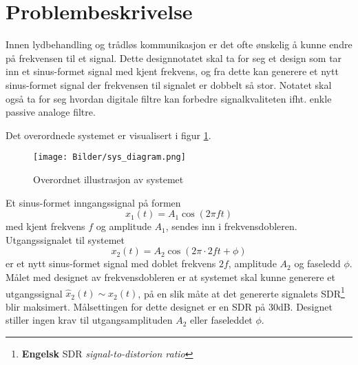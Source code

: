 \section{Problembeskrivelse}
\label{problemBeskrivelse}

Innen lydbehandling og trådløs kommunikasjon er det ofte ønskelig å kunne endre på frekvensen til 
et signal. Dette designnotatet skal ta for seg et design som tar inn et sinus-formet signal med kjent frekvens, og fra dette kan 
generere et nytt sinus-formet signal der frekvensen til signalet er dobbelt så stor. 
Notatet skal også ta for seg hvordan digitale filtre kan forbedre signalkvaliteten ifht. enkle passive analoge filtre.

Det overordnede systemet er visualisert i figur \ref{fig:top_level_sys}.
\begin{figure}[H]
    \centering
    \texttt{[image: Bilder/sys\_diagram.png]}
    \caption{Overordnet illustrasjon av systemet}
    \label{fig:top_level_sys}
\end{figure}

Et sinus-formet inngangssignal på formen 
$$x_1(t) = A_1 \cos{\left(2\pi ft\right)}$$ 
med kjent frekvens $f$ og amplitude $A_1$, sendes inn i frekvensdobleren.
Utgangssignalet til systemet
$$x_2(t) = A_2 \cos{\left(2\pi \cdot 2ft + \phi\right)}$$ 
er et nytt sinus-formet signal med doblet frekvens $2f$, amplitude $A_2$ og faseledd $\phi$.
Målet med designet av frekvensdobleren er at systemet skal kunne generere et utgangssignal $\hat{x}_2(t) \sim x_2(t)$, 
på en slik måte at det genererte signalets SDR\footnote{\textbf{Engelsk} SDR \textit{signal-to-distorion ratio}}
blir maksimert. Målsettingen for dette designet er en SDR på 30dB.
Designet stiller ingen krav til utgangsamplituden $A_2$ eller faseleddet $\phi$.
